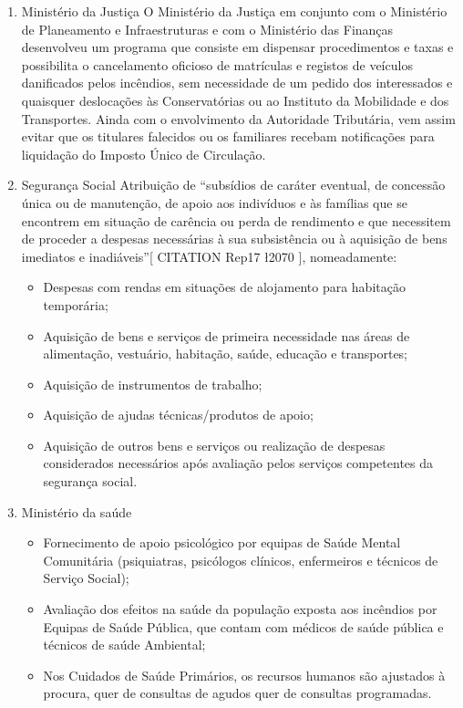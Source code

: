 \documentclass[a4paper,11pt]{report}
\begin{document}
\begin{enumerate}
 \item Ministério da Justiça
 O Ministério da Justiça em conjunto com o Ministério de Planeamento e Infraestruturas e com o Ministério das Finanças desenvolveu um programa que consiste em dispensar procedimentos e taxas e possibilita o cancelamento oficioso de matrículas e registos de veículos danificados pelos incêndios, sem necessidade de um pedido dos interessados e quaisquer deslocações às Conservatórias ou ao Instituto da Mobilidade e dos Transportes.
 Ainda com o envolvimento da Autoridade Tributária, vem assim evitar que os titulares falecidos ou os familiares recebam notificações para liquidação do Imposto Único de Circulação.
 
 \item Segurança Social 
 Atribuição de “subsídios de caráter eventual, de concessão única ou de manutenção, de apoio aos indivíduos e às famílias que se encontrem em situação de carência ou perda de rendimento e que necessitem de proceder a despesas necessárias à sua subsistência ou à aquisição de bens imediatos e inadiáveis”[ CITATION Rep17 \l 2070 ], nomeadamente:
 \begin{itemize}
 
  \item Despesas com rendas em situações de alojamento para habitação temporária; 
  \item Aquisição de bens e serviços de primeira necessidade nas áreas de alimentação, vestuário, habitação, saúde, educação e transportes; 
  \item Aquisição de instrumentos de trabalho; 
  \item Aquisição de ajudas técnicas/produtos de apoio; 
  \item Aquisição de outros bens e serviços ou realização de despesas considerados necessários após avaliação pelos serviços competentes da segurança social.
  
 \end{itemize}
 
 \item Ministério da saúde
 \begin{itemize}
  \item Fornecimento de apoio psicológico por equipas de Saúde Mental Comunitária (psiquiatras, psicólogos clínicos, enfermeiros e técnicos de Serviço Social); 
  \item Avaliação dos efeitos na saúde da população exposta aos incêndios por Equipas de Saúde Pública, que contam com médicos de saúde pública e técnicos de saúde Ambiental;
  \item Nos Cuidados de Saúde Primários, os recursos humanos são ajustados à procura, quer de consultas de agudos quer de consultas programadas.
  

\end{itemize}
\end{enumerate}
\end{document}
